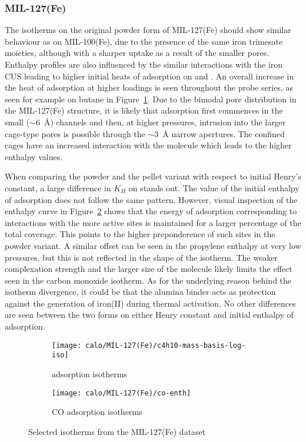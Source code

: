 
\subsubsection{MIL-127(Fe)}

The isotherms on the original powder form of MIL-127(Fe) 
should show similar behaviour as on MIL-100(Fe),
due to the presence of the same iron trimesate moieties,
although with a sharper uptake as a result of the smaller pores. Enthalpy 
profiles are also influenced by the similar interactions with the iron 
CUS leading to higher initial heats of adsorption on  and .
An overall increase in the heat of adsorption at higher loadings is seen
throughout the probe series, as seen for example on butane in 
Figure~\ref{fgr:shaping:mil127c4h10ads}. 
Due to the bimodal pore distribution in the MIL-127(Fe) structure,
it is likely that adsorption first commences in the small 
(\( \sim \)\SI{6}{\angstrom}) channels and then, at higher pressures, 
intrusion into the larger cage-type pores is possible through the
\( \sim \)\SI{3}{\angstrom} narrow apertures. 
The confined cages have an increased interaction with the molecule
which leads to the higher enthalpy values.

When comparing the powder and the pellet variant with respect to 
initial Henry's constant, a large difference in \(K_H\) on  
stands out. The value of the initial enthalpy of adsorption
does not follow the same pattern.
However, visual inspection of the enthalpy curve in
Figure~\ref{fgr:shaping:mil127coads} shows that the energy of
adsorption corresponding to
interactions with the more active sites is maintained for a larger 
percentage of the total coverage. 
This points to the higher preponderence of such sites in the powder
variant. A similar offset can be seen in the propylene enthalpy at very 
low pressures, but this is not reflected in the shape of the isotherm. 
The weaker complexation strength and the larger size of the molecule 
likely limits the effect seen in the carbon monoxide isotherm. 
As for the underlying reason behind the isotherm divergence, it 
could be that the alumina binder acts as protection against the
generation of iron(II) during thermal activation.
No other differences are seen between the two forms on either Henry
constant and initial enthalpy of adsorption.

\begin{figure}[htbp]
    \begin{subfigure}{0.5\textwidth}
        \texttt{[image: calo/MIL-127(Fe)/c4h10-mass-basis-log-iso]}
        \caption{ adsorption isotherms}%
        \label{fgr:shaping:mil127c4h10ads}
    \end{subfigure}
    \begin{subfigure}{0.5\textwidth}
        \texttt{[image: calo/MIL-127(Fe)/co-enth]}
        \caption{CO adsorption isotherms}%
        \label{fgr:shaping:mil127coads}
    \end{subfigure}%
    \caption{Selected isotherms from the MIL-127(Fe) dataset}%
    \label{fgr:shaping:mil127isotherms}
\end{figure}

